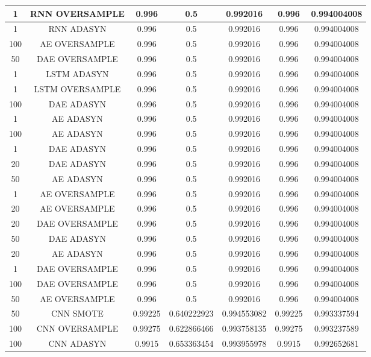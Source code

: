 \begin{longtable}{|c|c|c|c|c|c|c|}
  	1 & RNN OVERSAMPLE & 0.996 & 0.5 & 0.992016 & 0.996 & 0.994004008\\ \hline
  	1 & RNN ADASYN & 0.996 & 0.5 & 0.992016 & 0.996 & 0.994004008\\ \hline
  	100 & AE OVERSAMPLE & 0.996 & 0.5 & 0.992016 & 0.996 & 0.994004008\\ \hline
  	50 & DAE OVERSAMPLE & 0.996 & 0.5 & 0.992016 & 0.996 & 0.994004008\\ \hline
  	1 & LSTM ADASYN & 0.996 & 0.5 & 0.992016 & 0.996 & 0.994004008\\ \hline
  	1 & LSTM OVERSAMPLE & 0.996 & 0.5 & 0.992016 & 0.996 & 0.994004008\\ \hline
  	100 & DAE ADASYN & 0.996 & 0.5 & 0.992016 & 0.996 & 0.994004008\\ \hline
  	1 & AE ADASYN & 0.996 & 0.5 & 0.992016 & 0.996 & 0.994004008\\ \hline
  	100 & AE ADASYN & 0.996 & 0.5 & 0.992016 & 0.996 & 0.994004008\\ \hline
  	1 & DAE ADASYN & 0.996 & 0.5 & 0.992016 & 0.996 & 0.994004008\\ \hline
  	20 & DAE ADASYN & 0.996 & 0.5 & 0.992016 & 0.996 & 0.994004008\\ \hline
  	50 & AE ADASYN & 0.996 & 0.5 & 0.992016 & 0.996 & 0.994004008\\ \hline
  	1 & AE OVERSAMPLE & 0.996 & 0.5 & 0.992016 & 0.996 & 0.994004008\\ \hline
  	20 & AE OVERSAMPLE & 0.996 & 0.5 & 0.992016 & 0.996 & 0.994004008\\ \hline
  	20 & DAE OVERSAMPLE & 0.996 & 0.5 & 0.992016 & 0.996 & 0.994004008\\ \hline
  	50 & DAE ADASYN & 0.996 & 0.5 & 0.992016 & 0.996 & 0.994004008\\ \hline
  	20 & AE ADASYN & 0.996 & 0.5 & 0.992016 & 0.996 & 0.994004008\\ \hline
  	1 & DAE OVERSAMPLE & 0.996 & 0.5 & 0.992016 & 0.996 & 0.994004008\\ \hline
  	100 & DAE OVERSAMPLE & 0.996 & 0.5 & 0.992016 & 0.996 & 0.994004008\\ \hline
  	50 & AE OVERSAMPLE & 0.996 & 0.5 & 0.992016 & 0.996 & 0.994004008\\ \hline
  	50 & CNN SMOTE & 0.99225 & 0.640222923 & 0.994553082 & 0.99225 & 0.993337594\\ \hline
  	100 & CNN OVERSAMPLE & 0.99275 & 0.622866466 & 0.993758135 & 0.99275 & 0.993237589\\ \hline
  	100 & CNN ADASYN & 0.9915 & 0.653363454 & 0.993955978 & 0.9915 & 0.992652681\\ \hline

\end{longtable}
